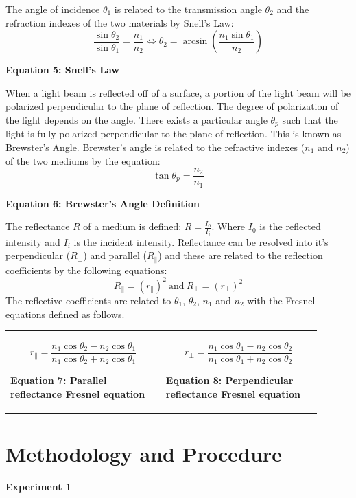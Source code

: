 \documentclass[
	letterpaper, %
	10pt, %
]{CSUniSchoolLabReport}
\begin{document}
The angle of incidence $\theta_1$ is related to the transmission angle $\theta_2$ and the refraction indexes of the two materials by Snell's Law:
$$\frac{\sin\theta_2}{\sin\theta_1} = \frac{n_1}{n_2} \iff \theta_2 = \arcsin\left(\frac{n_1\sin\theta_1}{n_2}\right)$$
\begin{center}
	\textbf{Equation 5: Snell's Law}
\end{center}

When a light beam is reflected off of a surface, a portion of the light beam will be polarized
perpendicular to the plane of reflection. The degree of polarization of the light depends
on the angle. There exists a particular angle $\theta_p$ such that the light is fully
polarized perpendicular to the plane of reflection. This is known as Brewster's Angle. Brewster's
angle is related to the refractive indexes ($n_1$ and $n_2$) of the two mediums by the equation:
$$\tan\theta_p = \frac{n_2}{n_1}$$
\begin{center}
	\textbf{Equation 6: Brewster's Angle Definition}
\end{center}

The reflectance $R$ of a medium is defined: $R = \frac{I_0}{I_i}$. Where $I_0$ is the reflected
intensity and $I_i$ is the incident intensity. Reflectance can be resolved into it's
perpendicular ($R_\perp$) and parallel ($R_\parallel$) and these are related to the reflection coefficients by the following equations:
$$R_\parallel =(r_\parallel)^2\  \mathrm{and }\ R_\perp = (r_\perp)^2$$
The reflective coefficients are related to $\theta_1$, $\theta_2$, $n_1$ and $n_2$ with the Fresnel
equations defined as follows.
\begin{tabular}{p{0.45\linewidth} p{0.45\linewidth}}
	$$ r_\parallel = \frac{n_1\cos\theta_2 - n_2\cos\theta_1}{n_1\cos\theta_2 + n_2\cos\theta_1}$$
	\begin{center}
		\textbf{Equation 7: Parallel reflectance Fresnel equation}
	\end{center}
	&
	$$r_\perp = \frac{n_1\cos\theta_1 - n_2\cos\theta_2}{n_1\cos\theta_1 + n_2\cos\theta_2}$$
	\begin{center}
		\textbf{Equation 8: Perpendicular reflectance Fresnel equation}
	\end{center}\\
\end{tabular}
\newpage
\section{Methodology and Procedure}
\textbf{Experiment 1}\\
\end{document}

